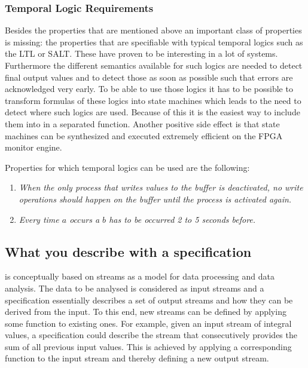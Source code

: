 \subsubsection{Temporal Logic Requirements}

Besides the properties that are mentioned above an important class of properties is missing: the properties that are specifiable with typical temporal logics such as the LTL or SALT. These have proven to be interesting in a lot of systems. Furthermore the different semantics available for such logics are needed to detect final output values and to detect those as soon as possible such that errors are acknowledged very early. To be able to use those logics it has to be possible to transform formulas of these logics into state machines which leads to the need to detect where such logics are used. Because of this it is the easiest way to include them into \tessla in a separated function. Another positive side effect is that state machines can be synthesized and executed extremely efficient on the FPGA monitor engine.

Properties for which temporal logics can be used are the following:

\begin{enumerate}
	\item \textit{When the only process that writes values to the buffer is deactivated, no write operations should happen on the buffer until the process is activated again.}
	\item \textit{Every time $a$ occurs a $b$ has to be occurred 2 to 5 seconds before.}
\end{enumerate}

\subsection{What you describe with a \tessla specification}

\tessla is conceptually based on streams as a model for data processing and data analysis.
The data to be analysed is considered as input streams and a \tessla specification essentially describes a set of output streams and how they can be derived from the input.
To this end, new streams can be defined by applying some function to existing ones.
For example, given an input stream of integral values, a \tessla specification could describe the stream that consecutively provides the sum of all previous input values.
This is achieved by applying a corresponding function to the input stream and thereby defining a new output stream.

